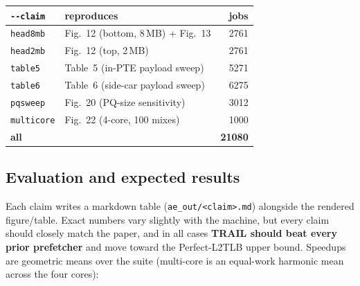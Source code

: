 \begin{center}\small
\begin{tabular}{@{}llr@{}}
\toprule
\texttt{-{}-claim} & reproduces & jobs \\
\midrule
\texttt{head8mb}   & Fig.~12 (bottom, 8\,MB) + Fig.~13 & 2761 \\
\texttt{head2mb}   & Fig.~12 (top, 2\,MB)              & 2761 \\
\texttt{table5}    & Table~5 (in-PTE payload sweep)    & 5271 \\
\texttt{table6}    & Table~6 (side-car payload sweep)  & 6275 \\
\texttt{pqsweep}   & Fig.~20 (PQ-size sensitivity)     & 3012 \\
\texttt{multicore} & Fig.~22 (4-core, 100 mixes)       & 1000 \\
\midrule
\textbf{all}       &                                   & \textbf{21080} \\
\bottomrule
\end{tabular}
\end{center}

\subsection{Evaluation and expected results}

Each claim writes a markdown table (\texttt{ae\_out/<claim>.md}) alongside the
rendered figure/table. Exact numbers vary slightly with the machine, but every
claim should closely match the paper, and in all cases \textbf{TRAIL should
beat every prior prefetcher} and move toward the Perfect-L2TLB upper bound.
Speedups are geometric means over the suite (multi-core is an equal-work
harmonic mean across the four cores):

